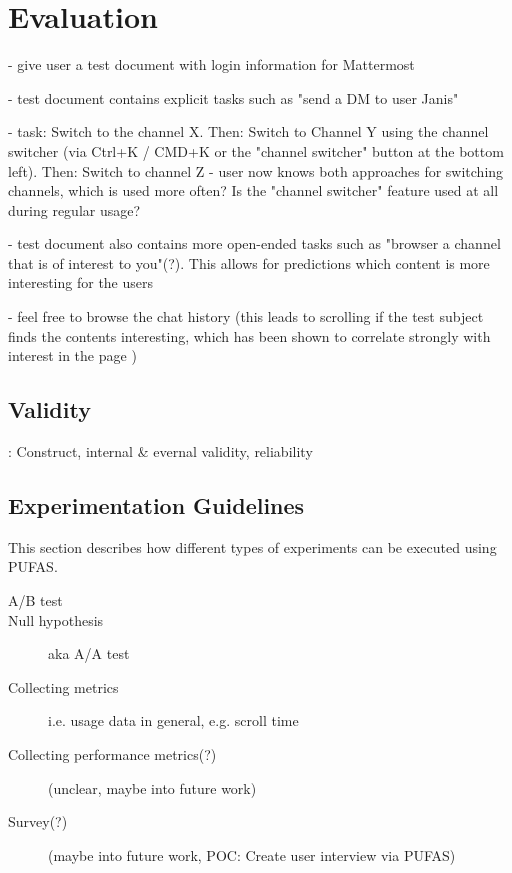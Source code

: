 %
\chapter{Evaluation}
\label{ch:evaluation}

- give user a test document with login information for Mattermost

- test document contains explicit tasks such as "send a DM to user Janis"

- task: Switch to the channel X. Then: Switch to Channel Y using the channel switcher (via Ctrl+K / CMD+K or the "channel switcher" button at the bottom left). Then: Switch to channel Z - user now knows both approaches for switching channels, which is used more often? Is the "channel switcher" feature used at all during regular usage?

- test document also contains more open-ended tasks such as "browser a channel that is of interest to you"(?).
This allows for predictions which content is more interesting for the users

- feel free to browse the chat history (this leads to scrolling if the test subject finds the contents interesting, which has been shown to correlate strongly with interest in the page \cite{Claypool2001})

%



\section{Validity}
\label{sec:evaluation:validity}

\cite{Easterbrook2008a}: Construct, internal \& evernal validity, reliability

\section{Experimentation Guidelines}

This section describes how different types of experiments can be executed using \ac{PUFAS}.

\begin{description}
\item[A/B test]
\item[Null hypothesis] aka A/A test \cite{Kohavi2009}
\item[Collecting metrics] i.e. usage data in general, e.g. scroll time
\item[Collecting performance metrics(?)] (unclear, maybe into future work)
\item[Survey(?)] (maybe into future work, POC: Create user interview via \ac{PUFAS})
\end{description}

